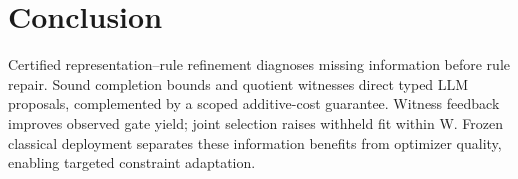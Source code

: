 \section{Conclusion}
\label{sec:conclusion}
Certified representation--rule refinement diagnoses missing information before
rule repair. Sound completion bounds and quotient witnesses direct typed
LLM proposals, complemented by a scoped additive-cost guarantee. Witness
feedback improves observed gate yield; joint selection raises withheld fit
within W. Frozen classical deployment separates these information benefits
from optimizer quality, enabling targeted constraint adaptation.
